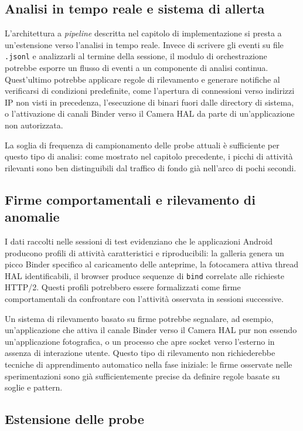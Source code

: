 \subsection{Analisi in tempo reale e sistema di allerta}

L'architettura a \textit{pipeline} descritta nel capitolo di implementazione si presta a un'estensione verso l'analisi in tempo reale. Invece di scrivere gli eventi su file \texttt{.jsonl} e analizzarli al termine della sessione, il modulo di orchestrazione potrebbe esporre un flusso di eventi a un componente di analisi continua. Quest'ultimo potrebbe applicare regole di rilevamento e generare notifiche al verificarsi di condizioni predefinite, come l'apertura di connessioni verso indirizzi IP non visti in precedenza, l'esecuzione di binari fuori dalle directory di sistema, o l'attivazione di canali Binder verso il Camera HAL da parte di un'applicazione non autorizzata.

La soglia di frequenza di campionamento delle probe attuali è sufficiente per questo tipo di analisi: come mostrato nel capitolo precedente, i picchi di attività rilevanti sono ben distinguibili dal traffico di fondo già nell'arco di pochi secondi.

\subsection{Firme comportamentali e rilevamento di anomalie}

I dati raccolti nelle sessioni di test evidenziano che le applicazioni Android producono profili di attività caratteristici e riproducibili: la galleria genera un picco Binder specifico al caricamento delle anteprime, la fotocamera attiva thread HAL identificabili, il browser produce sequenze di \texttt{bind} correlate alle richieste HTTP/2. Questi profili potrebbero essere formalizzati come firme comportamentali da confrontare con l'attività osservata in sessioni successive.

Un sistema di rilevamento basato su firme potrebbe segnalare, ad esempio, un'applicazione che attiva il canale Binder verso il Camera HAL pur non essendo un'applicazione fotografica, o un processo che apre socket verso l'esterno in assenza di interazione utente. Questo tipo di rilevamento non richiederebbe tecniche di apprendimento automatico nella fase iniziale: le firme osservate nelle sperimentazioni sono già sufficientemente precise da definire regole basate su soglie e pattern.

\subsection{Estensione delle probe}

